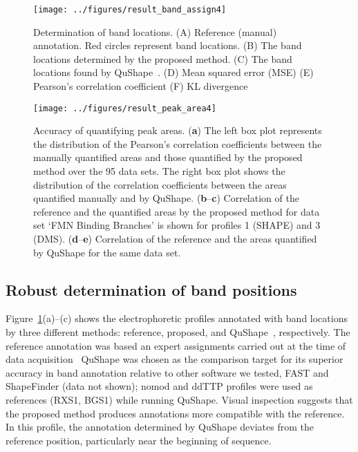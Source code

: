 \begin{figure}
\centering
\texttt{[image: ../figures/result\_band\_assign4]}
\caption{Determination of band locations. (A) Reference (manual) annotation. Red circles represent band locations. (B) The band locations determined by the proposed method. (C) The band locations found by QuShape~\citep{Karabiber2013}. (D) Mean squared error (MSE) (E) Pearson's correlation coefficient (F) KL divergence}
\label{f:band-assign}
\end{figure}

\begin{figure}
\centering
\texttt{[image: ../figures/result\_peak\_area4]}
\caption{Accuracy of quantifying peak areas. (\textbf{a}) The left box plot represents the distribution of the Pearson's correlation coefficients between the manually quantified areas and those quantified by the proposed method over the 95 data sets. The right box plot shows the distribution of the correlation coefficients between the areas quantified manually and by QuShape. (\textbf{b}--\textbf{c}) Correlation of the reference and the quantified areas by the proposed method for data set `FMN Binding Branches' is shown for profiles 1 (SHAPE) and 3 (DMS). (\textbf{d}--\textbf{e}) Correlation of the reference and the areas quantified by QuShape for the same data set.
}
\label{f:peak-area}
\end{figure}

\newcommand{\bP}{{\mathbf{P}}}


\subsection{Robust determination of band positions}\label{ss:band-position}
Figure~\ref{f:band-assign}(a)--(c) shows the electrophoretic profiles annotated with band locations by three different methods: reference, proposed, and QuShape~\citep{Karabiber2013}, respectively. The reference annotation was based an expert assignments carried out at the time of data acquisition~\citep{lee2014eterna} QuShape was chosen as the comparison target for its superior accuracy in band annotation relative to other software we tested, FAST and ShapeFinder (data not shown); nomod and ddTTP profiles were used as references (RXS1, BGS1) while running QuShape. Visual inspection suggests that the proposed method produces annotations more compatible with the reference. In this profile, the annotation determined by QuShape deviates from the reference position, particularly near the beginning of sequence.

